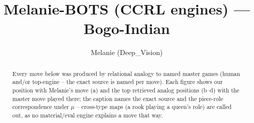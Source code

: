 \documentclass[11pt]{article}
\title{Melanie-BOTS (CCRL engines) — Bogo-Indian}
\author{Melanie (Deep\_Vision)}
\date{}
\begin{document}
\maketitle

\begin{abstract}Every move below was produced by relational analogy to named master games (human and/or top-engine -- the exact source is named per move). Each figure shows our position with Melanie's move (a) and the top retrieved analog positions (b--d) with the master move played there; the caption names the exact source and the piece-role correspondence under $\mu$ -- cross-type maps (a rook playing a queen's role) are called out, as no material/eval engine explains a move that way.\end{abstract}

\begin{figure}[p]\centering
\begin{subfigure}{0.46\textwidth}\centering
\resizebox{\linewidth}{!}{%
\newchessgame
\chessboard[
  setfen={r1b1k2r/ppppqppp/2n1pn2/8/2PP4/2B2NP1/PP2PP1P/R2QKB1R b KQkq - 0 7},
  showmover=false,
  pgfstyle=straightmove, color=movearrow, markmove={e8-g8}
]}
\caption{}
\end{subfigure}\hfill
\begin{subfigure}{0.46\textwidth}\centering
\resizebox{\linewidth}{!}{%
\newchessgame
\chessboard[
  setfen={r1bqk2r/p1pp1ppp/1pn2n2/4p3/2P1P3/P1N5/1P1P1PPP/R1BQKB1R b KQkq - 0 7},
  showmover=false,
  pgfstyle=straightmove, color=movearrow, markmove={e8-g8}
]}
\caption{}
\end{subfigure}
\\[4pt]
\begin{subfigure}{0.46\textwidth}\centering
\resizebox{\linewidth}{!}{%
\newchessgame
\chessboard[
  setfen={r1bqk2r/pppp1ppp/2n2n2/2P1p3/2P5/4PN2/P2PBPPP/R1BQK2R b KQkq - 4 8},
  showmover=false,
  pgfstyle=straightmove, color=movearrow, markmove={e8-g8}
]}
\caption{}
\end{subfigure}\hfill
\begin{subfigure}{0.46\textwidth}\centering
\resizebox{\linewidth}{!}{%
\newchessgame
\chessboard[
  setfen={rnbqkb1r/1p3ppp/p2ppn2/2p5/4P3/2N2NP1/PPPP1PBP/R1BQK2R w KQkq - 2 6},
  showmover=false,
  pgfstyle=straightmove, color=movearrow, markmove={e1-g1}
]}
\caption{}
\end{subfigure}

\end{figure}
\end{document}
